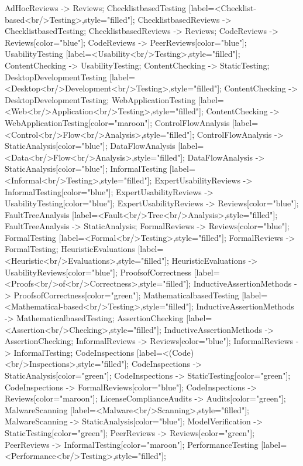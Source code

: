 \documentclass{article}
\begin{document}
{AdHocReviews -> Reviews;
ChecklistbasedTesting [label=<Checklist-based<br/>Testing>,style="filled"];
ChecklistbasedReviews -> ChecklistbasedTesting;
ChecklistbasedReviews -> Reviews;
CodeReviews -> Reviews[color="blue"];
CodeReviews -> PeerReviews[color="blue"];
UsabilityTesting [label=<Usability<br/>Testing>,style="filled"];
ContentChecking -> UsabilityTesting;
ContentChecking -> StaticTesting;
DesktopDevelopmentTesting [label=<Desktop<br/>Development<br/>Testing>,style="filled"];
ContentChecking -> DesktopDevelopmentTesting;
WebApplicationTesting [label=<Web<br/>Application<br/>Testing>,style="filled"];
ContentChecking -> WebApplicationTesting[color="maroon"];
ControlFlowAnalysis [label=<Control<br/>Flow<br/>Analysis>,style="filled"];
ControlFlowAnalysis -> StaticAnalysis[color="blue"];
DataFlowAnalysis [label=<Data<br/>Flow<br/>Analysis>,style="filled"];
DataFlowAnalysis -> StaticAnalysis[color="blue"];
InformalTesting [label=<Informal<br/>Testing>,style="filled"];
ExpertUsabilityReviews -> InformalTesting[color="blue"];
ExpertUsabilityReviews -> UsabilityTesting[color="blue"];
ExpertUsabilityReviews -> Reviews[color="blue"];
FaultTreeAnalysis [label=<Fault<br/>Tree<br/>Analysis>,style="filled"];
FaultTreeAnalysis -> StaticAnalysis;
FormalReviews -> Reviews[color="blue"];
FormalTesting [label=<Formal<br/>Testing>,style="filled"];
FormalReviews -> FormalTesting;
HeuristicEvaluations [label=<Heuristic<br/>Evaluations>,style="filled"];
HeuristicEvaluations -> UsabilityReviews[color="blue"];
ProofsofCorrectness [label=<Proofs<br/>of<br/>Correctness>,style="filled"];
InductiveAssertionMethods -> ProofsofCorrectness[color="green"];
MathematicalbasedTesting [label=<Mathematical-based<br/>Testing>,style="filled"];
InductiveAssertionMethods -> MathematicalbasedTesting;
AssertionChecking [label=<Assertion<br/>Checking>,style="filled"];
InductiveAssertionMethods -> AssertionChecking;
InformalReviews -> Reviews[color="blue"];
InformalReviews -> InformalTesting;
CodeInspections [label=<(Code)<br/>Inspections>,style="filled"];
CodeInspections -> StaticAnalysis[color="green"];
CodeInspections -> StaticTesting[color="green"];
CodeInspections -> FormalReviews[color="blue"];
CodeInspections -> Reviews[color="maroon"];
LicenseComplianceAudits -> Audits[color="green"];
MalwareScanning [label=<Malware<br/>Scanning>,style="filled"];
MalwareScanning -> StaticAnalysis[color="blue"];
ModelVerification -> StaticTesting[color="green"];
PeerReviews -> Reviews[color="green"];
PeerReviews -> InformalTesting[color="maroon"];
PerformanceTesting [label=<Performance<br/>Testing>,style="filled"];
}
\end{document}
